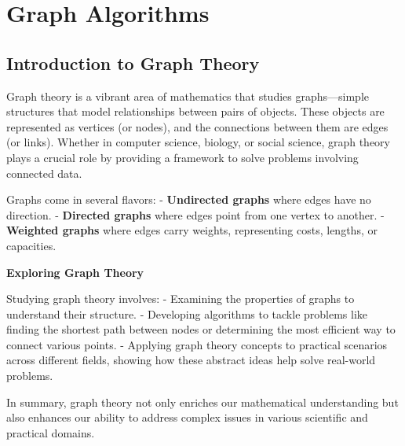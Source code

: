 \documentclass[12pt]{book} %
\begin{document}
\chapter{Graph Algorithms}
\section{Introduction to Graph Theory}

Graph theory is a vibrant area of mathematics that studies graphs—simple structures that model relationships between pairs of objects. These objects are represented as vertices (or nodes), and the connections between them are edges (or links). Whether in computer science, biology, or social science, graph theory plays a crucial role by providing a framework to solve problems involving connected data.


Graphs come in several flavors:
- \textbf{Undirected graphs} where edges have no direction.
- \textbf{Directed graphs} where edges point from one vertex to another.
- \textbf{Weighted graphs} where edges carry weights, representing costs, lengths, or capacities.

\textbf{Exploring Graph Theory}

Studying graph theory involves:
- Examining the properties of graphs to understand their structure.
- Developing algorithms to tackle problems like finding the shortest path between nodes or determining the most efficient way to connect various points.
- Applying graph theory concepts to practical scenarios across different fields, showing how these abstract ideas help solve real-world problems.

In summary, graph theory not only enriches our mathematical understanding but also enhances our ability to address complex issues in various scientific and practical domains.
\end{document}
